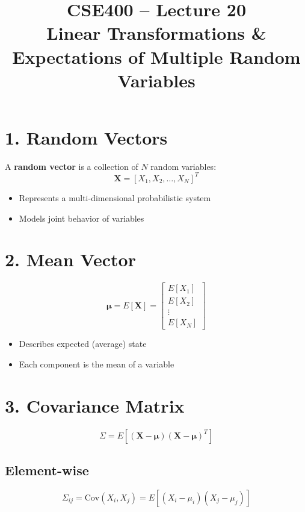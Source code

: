 \documentclass[12pt]{article}
\begin{document}
\title{\textbf{CSE400 – Lecture 20}\\
Linear Transformations \& Expectations of Multiple Random Variables}
\date{}
\maketitle

\section*{1. Random Vectors}

A \textbf{random vector} is a collection of $N$ random variables:
\[
\mathbf{X} = [X_1, X_2, \dots, X_N]^T
\]

\begin{itemize}
\item Represents a multi-dimensional probabilistic system
\item Models joint behavior of variables
\end{itemize}

\section*{2. Mean Vector}

\[
\boldsymbol{\mu} = E[\mathbf{X}] =
\begin{bmatrix}
E[X_1] \\
E[X_2] \\
\vdots \\
E[X_N]
\end{bmatrix}
\]

\begin{itemize}
\item Describes expected (average) state
\item Each component is the mean of a variable
\end{itemize}

\section*{3. Covariance Matrix}

\[
\Sigma = E[(\mathbf{X} - \boldsymbol{\mu})(\mathbf{X} - \boldsymbol{\mu})^T]
\]

\subsection*{Element-wise}
\[
\Sigma_{ij} = \text{Cov}(X_i, X_j) = E[(X_i - \mu_i)(X_j - \mu_j)]
\]
\end{document}
